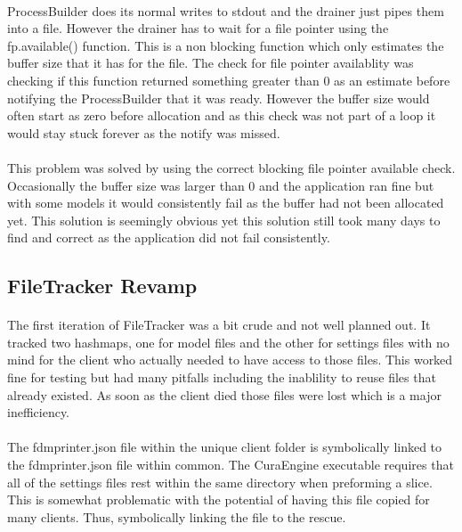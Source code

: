 \paragraph{}
ProcessBuilder does its normal writes to stdout and the drainer just pipes them into a file. 
However the drainer has to wait for a file pointer using the fp.available() function. 
This is a non blocking function which only estimates the buffer size that it has for the file. 
The check for file pointer availablity was checking if this function returned something greater than 0 as an estimate before notifying the ProcessBuilder that it was ready. 
However the buffer size would often start as zero before allocation and as this check was not part of a loop it would stay stuck forever as the notify was missed.

\paragraph{}
This problem was solved by using the correct blocking file pointer available check. 
Occasionally the buffer size was larger than 0 and the application ran fine but with some models it would consistently fail as the buffer had not been allocated yet.
This solution is seemingly obvious yet this solution still took many days to find and correct as the application did not fail consistently.

\subsection{FileTracker Revamp}
\paragraph{}
The first iteration of FileTracker was a bit crude and not well planned out. 
It tracked two hashmaps, one for model files and the other for settings files with no mind for the client who actually needed to have access to those files. 
This worked fine for testing but had many pitfalls including the inablility to reuse files that already existed. 
As soon as the client died those files were lost which is a major inefficiency.

\paragraph{}
The fdmprinter.json file within the unique client folder is symbolically linked to the fdmprinter.json file within common. 
The CuraEngine executable requires that all of the settings files rest within the same directory when preforming a slice. 
This is somewhat problematic with the potential of having this file copied for many clients. 
Thus, symbolically linking the file to the rescue.

